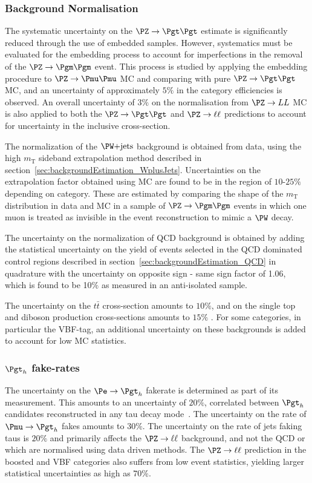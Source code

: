 \subsubsection{\textbf{Background Normalisation}}
The systematic uncertainty on the $\ZToTauTau$ estimate is significantly reduced
through the use of embedded samples. However, systematics must be evaluated for
the embedding process to account for imperfections in the removal of the
$\PZ\to\Pgm\Pgm$ event. This process is studied by applying the embedding
procedure to $\PZ\to\Pmu\Pmu$ \ac{MC} and comparing with pure $\ZToTauTau$
\ac{MC}, and an uncertainty of approximately $5\%$ in the category efficiencies
is observed. An overall uncertainty of $3\%$ on the normalisation from
$\PZ\to LL$ \ac{MC} is also applied to both the $\ZToTauTau$ and
$\PZ\to\ell\ell$ predictions to account for uncertainty in the inclusive
cross-section.

The normalization of the $\WJets$ background is obtained from data, 
using the high $m_{\text{T}}$ sideband extrapolation method described in
section~\ref{sec:backgroundEstimation_WplusJets}. Uncertainties on the
extrapolation factor obtained using \ac{MC} are found to be in the region of
$10$-$25\%$ depending on category. These are estimated by comparing the shape of
the $m_{\text{T}}$ distribution in data and \ac{MC} in a sample of
$\PZ\to\Pgm\Pgm$ events in which one muon is treated as invisible in the event
reconstruction to mimic a $\PW$ decay. 

The uncertainty on the normalization of QCD background is obtained by adding the
statistical uncertainty on the yield of events selected in the QCD dominated control regions
described in section~\ref{sec:backgroundEstimation_QCD} in quadrature with the
uncertainty on opposite sign - same sign factor of 1.06, which is found to be
10$\%$ as measured in an anti-isolated sample.

The uncertainty on the $t \bar{t}$ cross-section amounts to $10\%$, and on the single top and diboson
production cross-sections amounts to $15\%$
\cite{Chatrchyan:2013oev,Chatrchyan:2012ep}. For some categories, in particular
the VBF-tag, an additional uncertainty on these backgrounds is added to account
for low \ac{MC} statistics.  
 
\subsubsection{\textbf{$\Pgt_{h}$ fake-rates}} 
The uncertainty on the $\Pe \to \Pgt_{h}$ fakerate is determined as part of
its measurement. This amounts to an uncertainty of $20\%$, correlated between
$\Pgt_{h}$ candidates reconstructed in any tau decay mode~\cite{HIG-13-004}. 
The uncertainty on the rate of $\Pmu \to \Pgt_{h}$ fakes amounts to $30\%$.
The uncertainty on the rate of jets faking taus is $20\%$ and primarily affects
the $\PZ\to\ell\ell$ background, and not the QCD or \WJets which are normalised
using data driven methods. The $\PZ\to\ell\ell$ prediction in the boosted and
VBF categories also suffers from low event statistics, yielding larger
statistical uncertainties as high as $70\%$.

